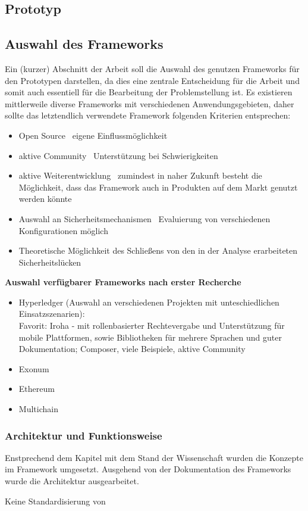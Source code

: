 \subsection{Prototyp}

\subsection{Auswahl des Frameworks}
    Ein (kurzer) Abschnitt der Arbeit soll die Auswahl des genutzen Frameworks für den Prototypen darstellen, da dies eine zentrale Entscheidung für die Arbeit und somit auch essentiell für die Bearbeitung der Problemstellung ist.
    Es existieren mittlerweile diverse Frameworks mit verschiedenen Anwendungsgebieten, daher sollte das letztendlich verwendete Framework folgenden Kriterien entsprechen:
    \begin{itemize}
        \item Open Source \textrightarrow\ eigene Einflussmöglichkeit
        \item aktive Community \textrightarrow\ Unterstützung bei Schwierigkeiten
        \item aktive Weiterentwicklung \textrightarrow\ zumindest in naher Zukunft besteht die Möglichkeit, dass das Framework auch in Produkten auf dem Markt genutzt werden könnte
        \item Auswahl an Sicherheitsmechanismen \textrightarrow\ Evaluierung von verschiedenen Konfigurationen möglich
        \item Theoretische Möglichkeit des Schließens von den in der Analyse erarbeiteten Sicherheitslücken
    \end{itemize}
    \medskip
    \textbf{Auswahl verfügbarer Frameworks nach erster Recherche}
    \begin{itemize}
        \item Hyperledger (Auswahl an verschiedenen Projekten mit unteschiedlichen Einsatzszenarien):\\
            Favorit: Iroha - mit rollenbasierter Rechtevergabe und Unterstützung für mobile Plattformen, sowie Bibliotheken für mehrere Sprachen und guter Dokumentation; Composer, viele Beispiele, aktive Community
        \item Exonum
        \item Ethereum
        \item Multichain
    \end{itemize}



\subsubsection{Architektur und Funktionsweise}
    Enstprechend dem Kapitel mit dem Stand der Wissenschaft wurden die Konzepte im Framework umgesetzt.
    Ausgehend von der Dokumentation des Frameworks \cite{SoramitsuCo.} wurde die Architektur ausgearbeitet. 
    
    
    Keine Standardisierung von 